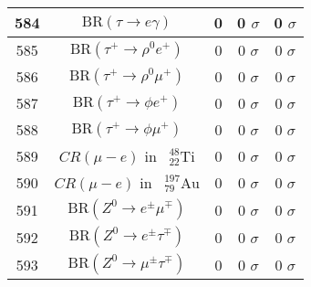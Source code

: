 \begin{longtable}{|c|c|c|c|c|}
584 &	 $\mathrm{BR}(\tau\to e\gamma)$ &	 0 &	 0 $ \sigma$ &	 0 $ \sigma$ \\ \hline
585 &	 $\mathrm{BR}(\tau^+\to \rho^0 e^+)$ &	 0 &	 0 $ \sigma$ &	 0 $ \sigma$ \\ \hline
586 &	 $\mathrm{BR}(\tau^+\to \rho^0\mu^+)$ &	 0 &	 0 $ \sigma$ &	 0 $ \sigma$ \\ \hline
587 &	 $\mathrm{BR}(\tau^+\to \phi e^+)$ &	 0 &	 0 $ \sigma$ &	 0 $ \sigma$ \\ \hline
588 &	 $\mathrm{BR}(\tau^+\to \phi\mu^+)$ &	 0 &	 0 $ \sigma$ &	 0 $ \sigma$ \\ \hline
589 &	 $CR(\mu - e)$ in $\phantom k^{48}_{22} \mathrm{Ti}$ &	 0 &	 0 $ \sigma$ &	 0 $ \sigma$ \\ \hline
590 &	 $CR(\mu - e)$ in $\phantom k^{197}_{79} \mathrm{Au}$ &	 0 &	 0 $ \sigma$ &	 0 $ \sigma$ \\ \hline
591 &	 $\mathrm{BR}(Z^0\to  e^\pm\mu^\mp)$ &	 0 &	 0 $ \sigma$ &	 0 $ \sigma$ \\ \hline
592 &	 $\mathrm{BR}(Z^0\to  e^\pm\tau^\mp)$ &	 0 &	 0 $ \sigma$ &	 0 $ \sigma$ \\ \hline
593 &	 $\mathrm{BR}(Z^0\to \mu^\pm\tau^\mp)$ &	 0 &	 0 $ \sigma$ &	 0 $ \sigma$ \\ \hline
\end{longtable}